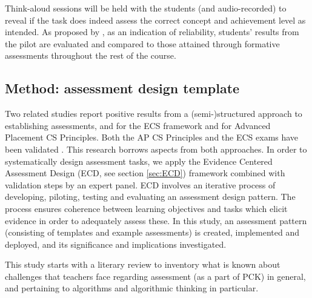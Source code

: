 Think-aloud sessions will be held with the students (and audio-recorded) to reveal if the task does indeed assess the correct concept and achievement level as intended. As proposed by , as an indication of reliability, students' results from the pilot are evaluated and compared to those attained through formative assessments throughout the rest of the course.





%


\subsection{Method: assessment design template}
Two related studies report positive results from a (semi-)structured approach to establishing assessments,  and  for the ECS framework and  for Advanced Placement CS Principles. Both the AP CS Principles and the ECS exams have been validated \cite{2010TewGuzdial}. This research borrows aspects from both approaches. In order to systematically design assessment tasks, we apply the Evidence Centered Assessment Design (ECD, see section \ref{sec:ECD}) framework combined with validation steps by an expert panel. ECD involves an iterative process of developing, piloting, testing and evaluating an assessment design pattern. The process ensures coherence between learning objectives and tasks which elicit evidence in order to adequately assess these.  In this study, an assessment pattern (consisting of templates and example assessments) is created, implemented and deployed, and its significance and implications investigated.



This study starts with a literary review to inventory what is known about challenges that teachers face regarding assessment (as a part of PCK) in general, and pertaining to algorithms and algorithmic thinking in particular.


